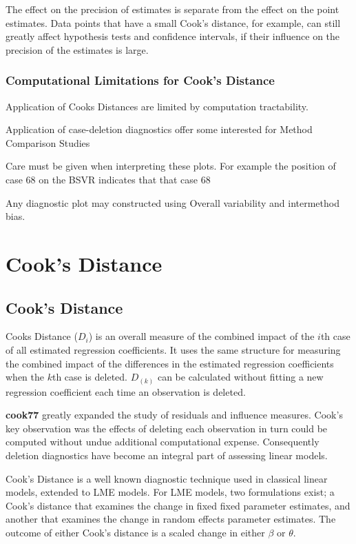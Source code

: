\documentclass[12pt, a4paper]{article}
\begin{document}
The effect on the precision of estimates is separate from the effect on the point estimates. Data points that
have a small Cook's distance, for example, can still greatly affect hypothesis tests and confidence intervals, if their  influence on the precision of the estimates is large.


\newpage
	\subsubsection{Computational Limitations for Cook's Distance}
	Application of Cooks Distances are limited by computation tractability.
	
	
	Application of case-deletion diagnostics offer some interested for Method Comparison Studies
	
	
	Care must be given when interpreting these plots. For example the position of case 68 on the BSVR indicates that that
	case 68
	
	
	
	Any diagnostic plot may constructed using Overall variability and intermethod bias.
	
\section{Cook's Distance} %

\subsection{Cook's Distance}%
Cooks Distance ($D_{i}$) is an overall measure of the combined impact of the $i$th case of all estimated regression coefficients. It uses the same structure for measuring the combined impact of the differences in the estimated regression coefficients when the $k$th case is deleted. $D_{(k)}$ can be calculated without fitting
a new regression coefficient each time an observation is deleted.


\textbf{cook77} greatly expanded the study of residuals and influence measures. Cook's key observation was the effects of deleting each observation in turn could be computed without undue additional computational expense. Consequently deletion diagnostics have become an integral part of assessing linear models.

Cook's Distance is a well known diagnostic technique used in classical linear models, extended to LME models.  For LME models, two formulations exist; a Cook's distance that examines the change in fixed fixed parameter estimates, and another that examines the change in random effects parameter estimates. The outcome of either Cook's distance is a scaled change in either $\beta$ or $\theta$.
\end{document}
